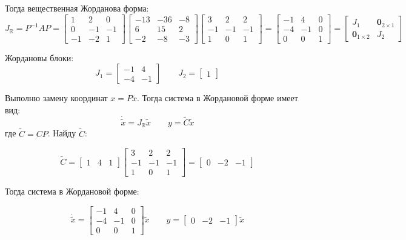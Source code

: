 \documentclass[a4paper,12pt]{article}
\begin{document}
	Тогда вещественная Жорданова форма:
	\[
	J_{\mathbb{R}} =P^{-1} A P =
	\begin{bmatrix}
		1 & 2 & 0 \\
		0 & -1 & -1 \\
		-1 & -2 & 1
	\end{bmatrix}
	\begin{bmatrix}
		-13 & -36 & -8 \\
		6 & 15 & 2 \\
		-2 & -8 & -3
	\end{bmatrix}
	\begin{bmatrix}
		3 & 2 & 2 \\
		-1 & -1 & -1 \\
		1 & 0 & 1
	\end{bmatrix}
	=
	\begin{bmatrix}
		-1 & 4 & 0 \\
		-4 & -1 & 0 \\
		0 & 0 & 1
	\end{bmatrix}
	= \begin{bmatrix}
		J_1 & \mathbf{0}_{2\times1}  \\
		\mathbf{0}_{1\times2} & J_2 
	\end{bmatrix}
	\]
	
	Жордановы блоки:
	\[
	J_1 = \begin{bmatrix} -1 & 4 \\ -4 & -1 \end{bmatrix} \qquad J_2 = \begin{bmatrix} 1 \end{bmatrix}
	\]
	
	Выполню замену координат $x = P\tilde{x}$. Тогда система в Жордановой форме имеет вид:
	\[
	\dot{\tilde{x}} = J_{\mathbb{R}}\tilde{x}
	\qquad
	y = \tilde{C}\tilde{x}
	\]
	где $\tilde{C} = CP$. Найду $\tilde{C}$:
	
	\[
	\tilde{C} =
	\begin{bmatrix}
		1 & 4 & 1
	\end{bmatrix}
	\begin{bmatrix}
		3 & 2 & 2 \\
		-1 & -1 & -1 \\
		1 & 0 & 1
	\end{bmatrix}
	=
	\begin{bmatrix}
		0 & -2 & -1
	\end{bmatrix}
	\]
	
	Тогда система в Жордановой форме:
	
	\[
	\dot{\tilde{x}} =
	\begin{bmatrix}
		-1 & 4 & 0 \\
		-4 & -1 & 0 \\
		0 & 0 & 1
	\end{bmatrix}
	\tilde{x}
	\qquad
	y =
	\begin{bmatrix}
		0 & -2 & -1
	\end{bmatrix}
	\tilde{x}
	\]
	
\end{document}
